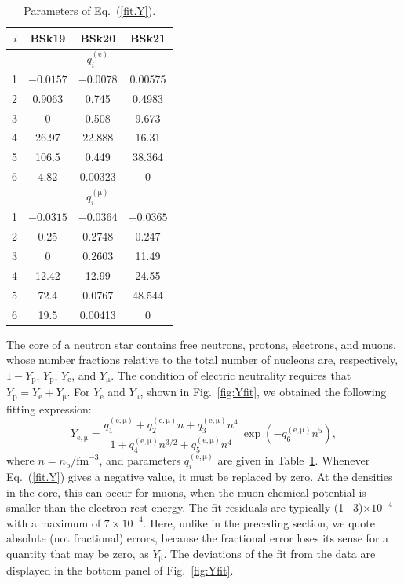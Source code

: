 \documentclass{aa}
\newcommand{\req}[1]{Eq.~(\ref{#1})}
\newcommand{\nb}{n_\mathrm{b}}
\begin{document}
\begin{table}
\centering
\caption[]{Parameters of \req{fit.Y}.}
\label{tab:fit.Y}
\begin{tabular}{r|ccc}
\hline\hline\rule[-1.4ex]{0pt}{4.3ex}
$i$ &  BSk19 & BSk20 & BSk21  \\
\hline\rule[-1.4ex]{0pt}{3.7ex}
 & \multicolumn{3}{c}{$q_i^\mathrm{(e)}$}  \\
1  & $-0.0157$ & $-0.0078$ & 0.00575 \\
2  & 0.9063 & 0.745 & 0.4983  \\       
3  & 0 & 0.508 & 9.673  \\             
4  & 26.97 & 22.888 & 16.31 \\ %
5  & 106.5 & 0.449 & 38.364  \\        
6  & 4.82 & 0.00323 & 0  \\            
\hline\rule[-1.4ex]{0pt}{3.7ex}
 & \multicolumn{3}{c}{$q_i^\mathrm{(\mu)}$} \\
1  & $-0.0315$ & $-0.0364$ & $-0.0365$ \\
2  &   0.25 & 0.2748 & 0.247 \\
3  &   0 & 0.2603 & 11.49 \\
4  &   12.42 & 12.99 & 24.55 \\
5  &   72.4 & 0.0767 & 48.544 \\
6  &   19.5 & 0.00413 & 0 \\
\hline\hline
\end{tabular}
\end{table}

The core of a neutron
star contains free neutrons, protons, electrons,
and muons, whose number fractions relative
to the total number of nucleons are, respectively, $1-Y_\mathrm{p}$,
$Y_\mathrm{p}$, $Y_\mathrm{e}$, and $Y_\mathrm{\mu}$. The condition of
electric neutrality requires that $Y_\mathrm{p} = Y_\mathrm{e}+Y_\mathrm{\mu}$. For $Y_\mathrm{e}$
and $Y_\mathrm{\mu}$, shown in Fig.~\ref{fig:Yfit},
we obtained the following fitting expression:
\begin{equation}
   Y_\mathrm{e,\mu} = \frac{
           q_1^\mathrm{(e,\mu)} + q_2^\mathrm{(e,\mu)} n + q_3^\mathrm{(e,\mu)}
                          n^4}{
          1+ q_4^\mathrm{(e,\mu)} n^{3/2} + q_5^\mathrm{(e,\mu)} n^4}
       \, \exp\left(-q_6^\mathrm{(e,\mu)} n^5 \right),
\label{fit.Y}
\end{equation}
where $n=\nb/\textrm{fm}^{-3}$, and parameters
$q_i^\mathrm{(e,\mu)}$ are given in Table~\ref{tab:fit.Y}. 
Whenever \req{fit.Y} gives a negative value, it must be
replaced by zero.  At the densities in the core, this can
occur for muons, when the muon chemical potential is smaller
than the electron rest energy. The fit residuals are
typically (1\,--\,3)$\times10^{-4}$ with a maximum of
$7\times10^{-4}$. Here, unlike in the preceding section, we
quote absolute (not fractional) errors, because the
fractional error loses its sense for a quantity that may be
zero, as $Y_\mathrm{\mu}$. The deviations of the fit from the data are
displayed in the bottom panel of Fig.~\ref{fig:Yfit}. 
\end{document}
